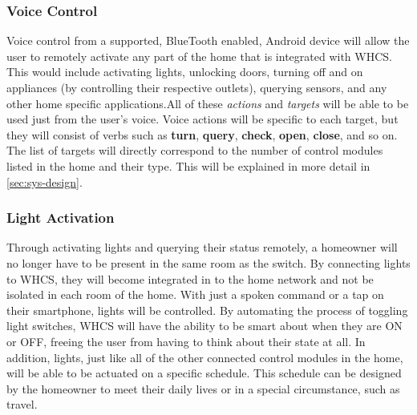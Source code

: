 \subsubsection{Voice Control}
Voice control from a supported, BlueTooth enabled, Android device will allow
the user to remotely activate any part of the home that is integrated with
WHCS. This would include activating lights, unlocking doors, turning off and on
appliances (by controlling their respective outlets), querying sensors, and any
other home specific applications.\footnotemark All of these \emph{actions} and
\emph{targets} will be able to be used just from the user's voice. Voice
actions will be specific to each target, but they will consist of verbs such as
\textbf{turn}, \textbf{query}, \textbf{check}, \textbf{open}, \textbf{close},
and so on. The list of targets will directly correspond to the number of
control modules listed in the home and their type.  This will be explained in
more detail in \autoref{sec:sys-design}.


\subsubsection{Light Activation}
Through activating lights and querying their status remotely, a homeowner will
no longer have to be present in the same room as the switch.  By connecting
lights to WHCS, they will become integrated in to the home network and not be
isolated in each room of the home.  With just a spoken command or a tap on
their smartphone, lights will be controlled.  By automating the process of
toggling light switches, WHCS will have the ability to be smart about when they
are ON or OFF, freeing the user from having to think about their state at all.
In addition, lights, just like all of the other connected control modules in
the home, will be able to be actuated on a specific schedule. This schedule
 can be designed by the homeowner
to meet their daily lives or in a special circumstance, such as travel.

